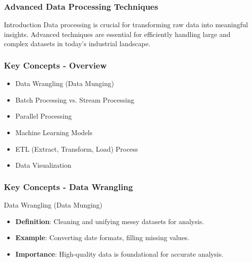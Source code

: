 \documentclass[aspectratio=169]{beamer}
\begin{document}
\begin{frame}[fragile]
    \frametitle{Advanced Data Processing Techniques}
    \begin{block}{Introduction}
        Data processing is crucial for transforming raw data into meaningful insights. Advanced techniques are essential for efficiently handling large and complex datasets in today's industrial landscape.
    \end{block}
\end{frame}

\begin{frame}[fragile]
    \frametitle{Key Concepts - Overview}
    \begin{itemize}
        \item Data Wrangling (Data Munging)
        \item Batch Processing vs. Stream Processing
        \item Parallel Processing
        \item Machine Learning Models
        \item ETL (Extract, Transform, Load) Process
        \item Data Visualization
    \end{itemize}
\end{frame}

\begin{frame}[fragile]
    \frametitle{Key Concepts - Data Wrangling}
    \begin{block}{Data Wrangling (Data Munging)}
        \begin{itemize}
            \item \textbf{Definition}: Cleaning and unifying messy datasets for analysis.
            \item \textbf{Example}: Converting date formats, filling missing values.
            \item \textbf{Importance}: High-quality data is foundational for accurate analysis.
        \end{itemize}
    \end{block}
\end{frame}
\end{document}

